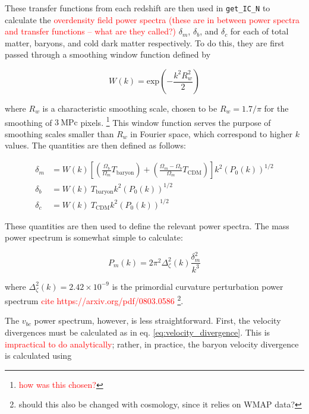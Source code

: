 \documentclass[floats,floatfix,showpacs,amssymb,prd,superscriptaddress,nofootinbib]{revtex4-2} %
\newcommand{\code}{\texttt}
\newcommand{\red}{\textcolor{red}}
\begin{document}
These transfer functions from each redshift are then used in \code{get\_IC\_N} to calculate the \red{overdensity field power spectra (these are in between power spectra and transfer functions -- what are they called?)} $\delta_m$, $\delta_b$, and $\delta_c$ for each of total matter, baryons, and cold dark matter respectively. To do this, they are first passed through a smoothing window function defined by 

\begin{equation}
    W(k) = \text{exp}\left( -\frac{k^2 R_w ^2}{2} \right)
\end{equation}

\noindent where $R_w$ is a characteristic smoothing scale, chosen to be $R_w = 1.7 / \pi$ for the smoothing of $3 ~\text{MPc}$ pixels. \footnote{\red{how was this chosen?}} This window function serves the purpose of smoothing scales smaller than $R_w$ in Fourier space, which correspond to higher $k$ values. The quantities are then defined as follows:

\begin{equation}
    \begin{split}
        \delta_m & = W(k) \left[ \left( \frac{\Omega_b}{\Omega_m} T_{\text{baryon}} \right) + \left( \frac{\Omega_m - \Omega_b}{\Omega_m} T_{\text{CDM}} \right) \right] k^2 \left( P_0 (k) \right)^{1/2} \\
        \delta_b & = W(k) ~ T_{\text{baryon}} k^2 \left( P_0 (k) \right)^{1/2} \\
        \delta_c & = W(k) ~ T_{\text{CDM}} k^2 \left( P_0 (k) \right)^{1/2}
    \end{split}
\end{equation}

These quantities are then used to define the relevant power spectra. The mass power spectrum is somewhat simple to calculate: 

\begin{equation}
    P_m(k) = 2\pi^2\Delta_\zeta ^2 (k) \frac{\delta_m^2}{k^3}
\end{equation}

\noindent where $\Delta_\zeta ^2 (k) = 2.42 \times 10^{-9}$ is the primordial curvature perturbation power spectrum \red{cite https://arxiv.org/pdf/0803.0586} \footnote{should this also be changed with cosmology, since it relies on WMAP data?}. 

The $v_{bc}$ power spectrum, however, is less straightforward. First, the velocity divergences must be calculated as in eq. \ref{eq:velocity_divergence}. This is \red{impractical to do analytically}; rather, in practice, the baryon velocity divergence is calculated using
\end{document}
